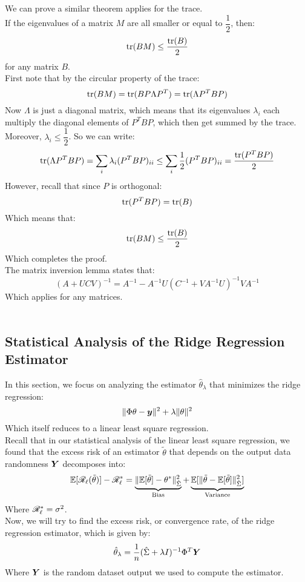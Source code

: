\documentclass[12pt]{article}
\begin{document}
We can prove a similar theorem applies for the trace. \\ 
If the eigenvalues of a matrix $M$
are all smaller or equal to $\dfrac{1}{2}$, then:
\[ \text{tr}(BM) \leq \dfrac{\text{tr}(B)}{2} \]
for any matrix $B$. \\
First note that
by the circular property of the trace:
\[ \text{tr}(BM) = \text{tr}(B P\Lambda P^T) = \text{tr}(\Lambda P^T B P) \]
Now $\Lambda$ is just a diagonal matrix,
which means that its eigenvalues
$\lambda_i$ each multiply the diagonal
elements of $P^T B P$,
which then get summed by the trace.
Moreover, $\lambda_i \leq \dfrac{1}{2}$.
So we can write:
\[ \text{tr}(\Lambda P^T B P) 
= \sum_i{\lambda_i (P^T B P)_{ii}}
\leq \sum_i{\dfrac{1}{2} (P^T B P)_{ii}} = 
\dfrac{\text{tr}(P^T B P)}{2} \]
However, recall that since $P$ is orthogonal:
\[ \text{tr}(P^T B P) = \text{tr}(B) \]
Which means that:
\[ \text{tr}(BM) \leq \dfrac{\text{tr}(B)}{2} \]
Which completes the proof. \\

The matrix inversion lemma states that:
\[ {\displaystyle \left(A+UCV\right)^{-1}=
A^{-1}-A^{-1}U\left(C^{-1}+VA^{-1}U\right)^{-1}
VA^{-1}} \]
Which applies for any matrices. \\\

\newpage

\subsection*{Statistical Analysis of the 
Ridge Regression Estimator}

In this section,
we focus on analyzing the estimator 
$\hat{\theta}_\lambda$
that minimizes the ridge regression:
\[ \|\Phi \theta - \boldsymbol{y} \|^2 + \lambda\|\theta\|^2 \]
Which itself reduces to a linear least square
regression. \\

Recall that in our statistical analysis
of the linear least square regression,
we found that the excess risk
of an estimator $\tilde{\theta}$
that depends on the output data randomness 
$\boldsymbol{Y}$ decomposes into:
\[ \mathbb{E}[\mathscr{R}_{\ell}(\tilde{\theta})] 
- \mathscr{R}_{\ell}^* = \underbrace{
\| \mathbb{E}[\tilde{\theta}] - \theta^*
\|^2_{\hat{\Sigma}}}_{\text{Bias}}
+ \underbrace{
\mathbb{E}[\|\tilde{\theta} - \mathbb{E}[\tilde{\theta}] 
\|^2_{\hat{\Sigma}}]}_{\text{Variance}}\]
Where $\mathscr{R}_{\ell}^* = \sigma^2$. \\

Now, we will try to find the excess risk,
or convergence rate, of the ridge regression
estimator, which is given by:
\[ \hat{\theta}_\lambda
= \dfrac{1}{n}(\hat{\Sigma} + \lambda I)^{-1}
\Phi^T \boldsymbol{Y} \]
Where $\boldsymbol{Y}$ is the random dataset output
we used to compute the estimator. \\
\end{document}
